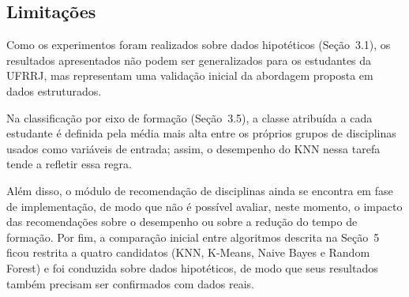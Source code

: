 \subsection{Limitações}

Como os experimentos foram realizados sobre dados hipotéticos (Seção~3.1), os resultados apresentados não podem ser generalizados para os estudantes da UFRRJ, mas representam uma validação inicial da abordagem proposta em dados estruturados.

Na classificação por eixo de formação (Seção~3.5), a classe atribuída a cada estudante é definida pela média mais alta entre os próprios grupos de disciplinas usados como variáveis de entrada; assim, o desempenho do KNN nessa tarefa tende a refletir essa regra.

Além disso, o módulo de recomendação de disciplinas ainda se encontra em fase de implementação, de modo que não é possível avaliar, neste momento, o impacto das recomendações sobre o desempenho ou sobre a redução do tempo de formação. Por fim, a comparação inicial entre algoritmos descrita na Seção~5 ficou restrita a quatro candidatos (KNN, K-Means, Naive Bayes e Random Forest) e foi conduzida sobre dados hipotéticos, de modo que seus resultados também precisam ser confirmados com dados reais.
